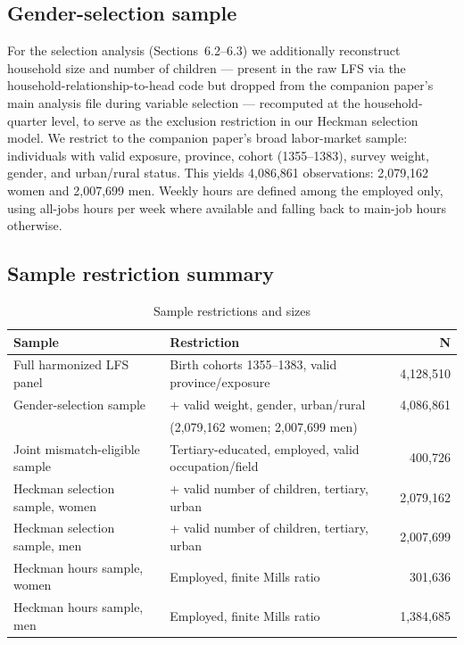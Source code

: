 \documentclass[11pt]{article}
\begin{document}
\subsection{Gender-selection sample}

For the selection analysis (Sections~6.2--6.3) we additionally reconstruct household size and number of children --- present in the raw LFS via the household-relationship-to-head code but dropped from the companion paper's main analysis file during variable selection --- recomputed at the household-quarter level, to serve as the exclusion restriction in our Heckman selection model. We restrict to the companion paper's broad labor-market sample: individuals with valid exposure, province, cohort (1355--1383), survey weight, gender, and urban/rural status. This yields 4{,}086{,}861 observations: 2{,}079{,}162 women and 2{,}007{,}699 men. Weekly hours are defined among the employed only, using all-jobs hours per week where available and falling back to main-job hours otherwise.

\subsection{Sample restriction summary}

\begin{table}[htbp]
\centering
\caption{Sample restrictions and sizes}
\label{tab:samples}
\begin{tabular}{lp{7cm}r}
\toprule
Sample & Restriction & N \\
\midrule
Full harmonized LFS panel & Birth cohorts 1355--1383, valid province/exposure & 4{,}128{,}510 \\
Gender-selection sample & + valid weight, gender, urban/rural & 4{,}086{,}861 \\
 & \quad (2{,}079{,}162 women; 2{,}007{,}699 men) & \\
Joint mismatch-eligible sample & Tertiary-educated, employed, valid occupation/field & 400{,}726 \\
Heckman selection sample, women & + valid number of children, tertiary, urban & 2{,}079{,}162 \\
Heckman selection sample, men & + valid number of children, tertiary, urban & 2{,}007{,}699 \\
Heckman hours sample, women & Employed, finite Mills ratio & 301{,}636 \\
Heckman hours sample, men & Employed, finite Mills ratio & 1{,}384{,}685 \\
\bottomrule
\end{tabular}
\end{table}
\end{document}
